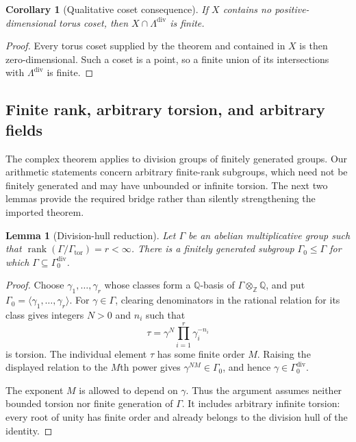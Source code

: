 \documentclass[11pt]{article}
\newtheorem{lemma}[theorem]{Lemma}
\newtheorem{corollary}[theorem]{Corollary}
\theoremstyle{definition}
\theoremstyle{remark}
\newcommand{\Z}{\mathbb{Z}}
\newcommand{\Q}{\mathbb{Q}}
\newcommand{\Gam}{\Gamma}
\newcommand{\divh}{\mathrm{div}}
\newcommand{\tor}{\mathrm{tor}}
\newcommand{\rank}{\operatorname{rank}}
\begin{document}
\begin{corollary}[Qualitative coset consequence]
\label{cor:laurent}
If $X$ contains no positive-dimensional torus coset, then
$X\cap\Lambda^{\divh}$ is finite.
\end{corollary}

\begin{proof}
Every torus coset supplied by the theorem and contained in $X$ is then zero-dimensional.  Such a coset is a point, so a finite union of its intersections with $\Lambda^{\divh}$ is finite.
\end{proof}

\subsection{Finite rank, arbitrary torsion, and arbitrary fields}

The complex theorem applies to division groups of finitely generated groups.  Our arithmetic statements concern arbitrary finite-rank subgroups, which need not be finitely generated and may have unbounded or infinite torsion.  The next two lemmas provide the required bridge rather than silently strengthening the imported theorem.

\begin{lemma}[Division-hull reduction]
\label{lem:division-hull}
Let $\Gam$ be an abelian multiplicative group such that
$\rank(\Gam/\Gam_{\tor})=r<\infty$.  There is a finitely generated subgroup
$\Gam_0\leq\Gam$ for which $\Gam\subseteq\Gam_0^{\divh}$.
\end{lemma}

\begin{proof}
Choose $\gamma_1,\ldots,\gamma_r$ whose classes form a $\Q$-basis of
$\Gam\otimes_{\Z}\Q$, and put
$\Gam_0=\langle\gamma_1,\ldots,\gamma_r\rangle$.  For
$\gamma\in\Gam$, clearing denominators in the rational relation for its class gives integers $N>0$ and $n_i$ such that
\[
\tau=\gamma^N\prod_{i=1}^r\gamma_i^{-n_i}
\]
is torsion.  The individual element $\tau$ has some finite order $M$.  Raising the displayed relation to the $M$th power gives
$\gamma^{NM}\in\Gam_0$, and hence $\gamma\in\Gam_0^{\divh}$.

The exponent $M$ is allowed to depend on $\gamma$.  Thus the argument assumes neither bounded torsion nor finite generation of $\Gam$.  It includes arbitrary infinite torsion: every root of unity has finite order and already belongs to the division hull of the identity.
\end{proof}
\end{document}
